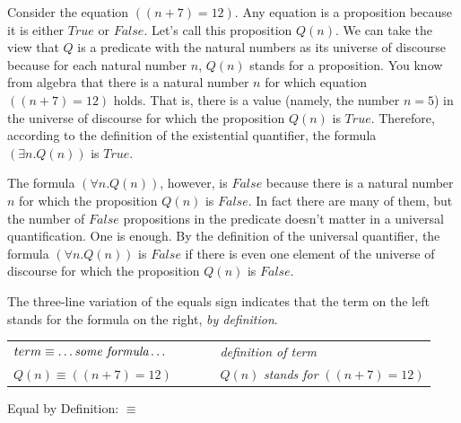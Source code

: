 {{Consider the equation $((n + 7) = 12)$.
Any equation is a proposition because it is either
$True$ or $False$. Let's call this proposition $Q(n)$.
We can take the view that $Q$ is a predicate
with the natural numbers as its universe of discourse
because for each natural number $n$,
$Q(n)$ stands for a proposition.
You know from algebra that there is a natural number
$n$ for which equation $((n + 7) = 12)$ holds.
That is, there is a value (namely, the number $n=5$) in the universe
of discourse for which the proposition $Q(n)$ is $True$.
Therefore, according to the definition of the
existential quantifier,
the formula $(\exists n.Q(n))$ is $True$.

The formula $(\forall n.Q(n))$, however, is $False$
because there is a natural number $n$ for which
the proposition $Q(n)$ is $False$.
In fact there are many of them, but
the number of $False$ propositions in the predicate doesn't matter
in a universal quantification. One is enough.
By the definition of the universal quantifier,
the formula $(\forall n.Q(n))$
is $False$ if there is even one element of the
universe of discourse for which the proposition
$Q(n)$ is $False$.

\begin{aside}
The three-line variation of the equals sign
indicates that the term on the left stands
for the formula on the right, \emph{by definition}.
\begin{center}
\begin{tabular}{ll}
$term \equiv \dots \emph{some formula} \dots$ & ~~~~~ \emph{definition of term} \\
$Q(n) \equiv ((n + 7) = 12)$                  & ~~~~~ $Q(n)$ \emph{stands for} $((n + 7) = 12)$ \\
\end{tabular}
\end{center}
\caption{Equal by Definition: $\equiv$}
\label{aside:ch02-three-line-equal}
\end{aside}

}}
